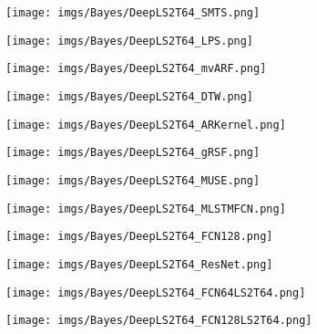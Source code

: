 \documentclass{article} \usepackage{iclr2021_conference,times}
\theoremstyle{plain}
\theoremstyle{definition}
\begin{document}
\begin{figure}
	\centering
	\begin{minipage}{0.245\textwidth}
		\centering
\texttt{[image: imgs/Bayes/DeepLS2T64\_SMTS.png]}
\end{minipage}
	\begin{minipage}{0.245\textwidth}
		\centering
\texttt{[image: imgs/Bayes/DeepLS2T64\_LPS.png]}
\end{minipage}
	\begin{minipage}{0.245\textwidth}
		\centering
\texttt{[image: imgs/Bayes/DeepLS2T64\_mvARF.png]}
\end{minipage}
	\begin{minipage}{0.245\textwidth}
		\centering
\texttt{[image: imgs/Bayes/DeepLS2T64\_DTW.png]}
\end{minipage}
\begin{minipage}{0.245\textwidth}
		\centering
\texttt{[image: imgs/Bayes/DeepLS2T64\_ARKernel.png]}
\end{minipage}
	\begin{minipage}{0.245\textwidth}
		\centering
\texttt{[image: imgs/Bayes/DeepLS2T64\_gRSF.png]}
\end{minipage}
\begin{minipage}{0.245\textwidth}
		\centering
\texttt{[image: imgs/Bayes/DeepLS2T64\_MUSE.png]}
\end{minipage}
\begin{minipage}{0.245\textwidth}
		\centering
\texttt{[image: imgs/Bayes/DeepLS2T64\_MLSTMFCN.png]}
\end{minipage}
	\begin{minipage}{0.245\textwidth}
		\centering
\texttt{[image: imgs/Bayes/DeepLS2T64\_FCN128.png]}
\end{minipage}
	\begin{minipage}{0.245\textwidth}
		\centering
\texttt{[image: imgs/Bayes/DeepLS2T64\_ResNet.png]}
\end{minipage}
	\begin{minipage}{0.245\textwidth}
		\centering
\texttt{[image: imgs/Bayes/DeepLS2T64\_FCN64LS2T64.png]}
\end{minipage}
	\begin{minipage}{0.245\textwidth}
		\centering
\texttt{[image: imgs/Bayes/DeepLS2T64\_FCN128LS2T64.png]}
\end{minipage}
	\begin{minipage}{0.245\textwidth}

\end{minipage}
\end{figure}
\end{document}
